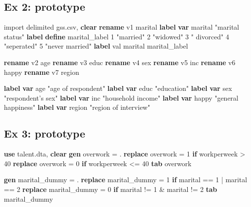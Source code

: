 \documentclass[
]{book}
\newenvironment{Shaded}{\begin{snugshade}}{\end{snugshade}}
\newcommand{\KeywordTok}[1]{\textcolor[rgb]{0.13,0.29,0.53}{\textbf{#1}}}
\newcommand{\NormalTok}[1]{#1}
\newcommand{\StringTok}[1]{\textcolor[rgb]{0.31,0.60,0.02}{#1}}
\begin{document}
\hypertarget{ex-2-prototype-4}{%
\subsection{Ex 2: prototype}\label{ex-2-prototype-4}}

\begin{Shaded}
\begin{Highlighting}[]
\NormalTok{import delimited gss.csv, }\KeywordTok{clear}
\KeywordTok{rename}\NormalTok{ v1 marital}
\KeywordTok{label} \KeywordTok{var}\NormalTok{ marital }\StringTok{"marital status"}
\KeywordTok{label} \KeywordTok{define}\NormalTok{ marital_label 1 }\StringTok{"married"}\NormalTok{ 2 }\StringTok{"widowed"}\NormalTok{ 3 }\StringTok{" divorced"}\NormalTok{ 4 }\StringTok{"seperated"}\NormalTok{ 5 }\StringTok{"never married"}
\KeywordTok{label}\NormalTok{ val marital marital_label}

\KeywordTok{rename}\NormalTok{ v2 age}
\KeywordTok{rename}\NormalTok{ v3 educ}
\KeywordTok{rename}\NormalTok{ v4 sex}
\KeywordTok{rename}\NormalTok{ v5 inc}
\KeywordTok{rename}\NormalTok{ v6 happy}
\KeywordTok{rename}\NormalTok{ v7 region}


\KeywordTok{label} \KeywordTok{var}\NormalTok{ age }\StringTok{"age of respondent"}
\KeywordTok{label} \KeywordTok{var}\NormalTok{ educ }\StringTok{"education"}
\KeywordTok{label} \KeywordTok{var}\NormalTok{ sex }\StringTok{"respondent's sex"}
\KeywordTok{label} \KeywordTok{var}\NormalTok{ inc }\StringTok{"household income"}
\KeywordTok{label} \KeywordTok{var}\NormalTok{ happy }\StringTok{"general happiness"}
\KeywordTok{label} \KeywordTok{var}\NormalTok{ region }\StringTok{"region of interview"}
\end{Highlighting}
\end{Shaded}

\hypertarget{ex-3-prototype-4}{%
\subsection{Ex 3: prototype}\label{ex-3-prototype-4}}

\begin{Shaded}
\begin{Highlighting}[]
\KeywordTok{use}\NormalTok{ talent.dta, }\KeywordTok{clear}
\KeywordTok{gen}\NormalTok{ overwork = .}
\KeywordTok{replace}\NormalTok{ overwork = 1 }\KeywordTok{if}\NormalTok{ workperweek > 40}
\KeywordTok{replace}\NormalTok{ overwork = 0 }\KeywordTok{if}\NormalTok{ workperweek <= 40}
\KeywordTok{tab}\NormalTok{ overwork}

\KeywordTok{gen}\NormalTok{ marital_dummy = .}
\KeywordTok{replace}\NormalTok{ marital_dummy = 1 }\KeywordTok{if}\NormalTok{ marital == 1 | marital == 2}
\KeywordTok{replace}\NormalTok{ marital_dummy = 0 }\KeywordTok{if}\NormalTok{ marital != 1 & marital != 2}
\KeywordTok{tab}\NormalTok{ marital_dummy}
\end{Highlighting}
\end{Shaded}
\end{document}
